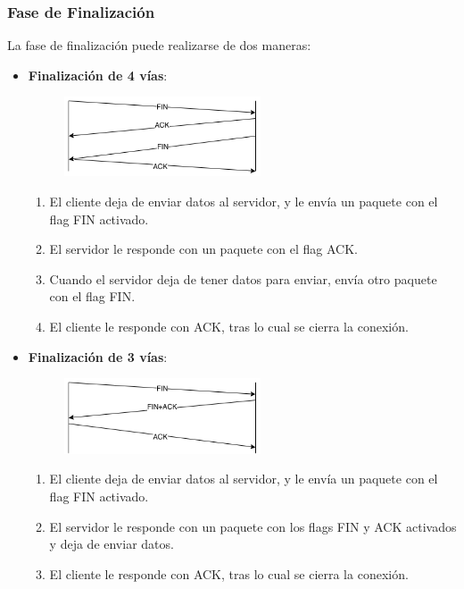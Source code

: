 \subsubsection{Fase de Finalización}
La fase de finalización puede realizarse de dos maneras:
\begin{itemize}
    \item \textbf{Finalización de 4 vías}:
\begin{figure}[H]
    \centering
    \includegraphics[width=0.55\textwidth]{img/FIN4.png}
\end{figure}
    \begin{enumerate}
        \item El cliente deja de enviar datos al servidor, y le envía un paquete con el flag FIN activado.
        \item El servidor le responde con un paquete con el flag ACK.
        \item Cuando el servidor deja de tener datos para enviar, envía otro paquete con el flag FIN.
        \item El cliente le responde con ACK, tras lo cual se cierra la conexión.
    \end{enumerate}
    \item \textbf{Finalización de 3 vías}:
\begin{figure}[H]
    \centering
    \includegraphics[width=0.55\textwidth]{img/FIN3.png}
\end{figure}
    \begin{enumerate}
        \item El cliente deja de enviar datos al servidor, y le envía un paquete con el flag FIN activado.
        \item El servidor le responde con un paquete con los flags FIN y ACK activados y deja de enviar datos.
        \item El cliente le responde con ACK, tras lo cual se cierra la conexión.
    \end{enumerate}

\end{itemize}
